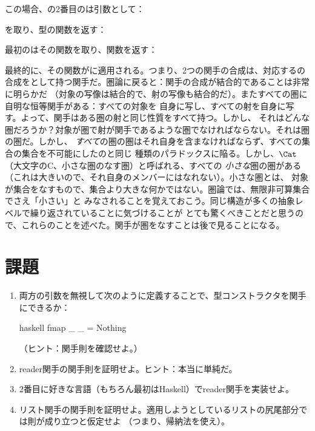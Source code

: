 この場合、の2番目のは引数として：

を取り、型の関数を返す：

最初のはその関数を取り、関数を返す：

最終的に、その関数がに適用される。つまり、2つの関手の合成は、対応するの
合成をとして持つ関手だ。圏論に戻ると：関手の合成が結合的であることは非常に明らかだ
（対象の写像は結合的で、射の写像も結合的だ）。またすべての圏に自明な恒等関手がある：すべての対象を
自身に写し、すべての射を自身に写す。よって、関手はある圏の射と同じ性質をすべて持つ。しかし、
それはどんな圏だろうか？対象が圏で射が関手であるような圏でなければならない。それは圏の圏だ。しかし、
\emph{すべて}の圏の圏はそれ自身を含まなければならず、すべての集合の集合を不可能にしたのと同じ
種類のパラドックスに陥る。しかし、$\Cat$（大文字のC、小さな圏のなす圏）と呼ばれる、すべての
\emph{小さな}圏の圏がある（これは大きいので、それ自身のメンバーにはなれない）。小さな圏とは、
対象が集合をなすもので、集合より大きな何かではない。圏論では、無限非可算集合でさえ「小さい」と
みなされることを覚えておこう。同じ構造が多くの抽象レベルで繰り返されていることに気づけることが
とても驚くべきことだと思うので、これらのことを述べた。関手が圏をなすことは後で見ることになる。

\section{課題}

\begin{enumerate}
  \tightlist
  \item
        両方の引数を無視して次のように定義することで、型コンストラクタを関手にできるか：

        \begin{snip}{haskell}
fmap _ _ = Nothing
\end{snip}

        （ヒント：関手則を確認せよ。）
  \item
        reader関手の関手則を証明せよ。ヒント：本当に単純だ。
  \item
        2番目に好きな言語（もちろん最初はHaskell）でreader関手を実装せよ。
  \item
        リスト関手の関手則を証明せよ。適用しようとしているリストの尻尾部分では則が成り立つと仮定せよ
        （つまり、帰納法を使え）。
\end{enumerate}
